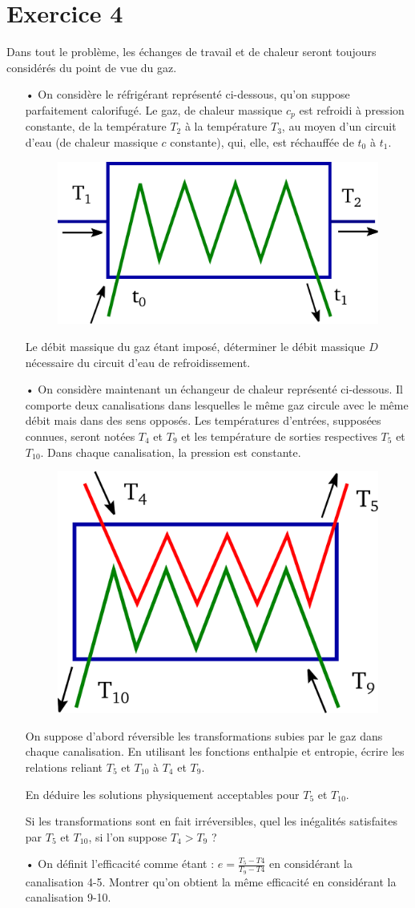 \documentclass{report}
\begin{document}
\section*{Exercice 4}

Dans tout le problème, les échanges de travail et de chaleur seront toujours considérés du point de vue du gaz.
\begin{itemize}

\item[•] On considère le réfrigérant représenté ci-dessous, qu'on suppose parfaitement calorifugé. Le gaz, de chaleur massique $c_{p}$ est refroidi à pression constante, de la température $T_{2}$ à la température $T_{3}$, au moyen d'un circuit d'eau (de chaleur massique $c$ constante), qui, elle, est réchauffée de $t_{0}$ à $t_{1}$.

\begin{figure}[!h]
\centering
\includegraphics[width=0.3\linewidth]{refrigirant.pdf}
\end{figure}

Le débit massique du gaz étant imposé, déterminer le débit massique $D$ nécessaire du circuit d'eau de refroidissement.
\item[•] On considère maintenant un échangeur de chaleur représenté ci-dessous. Il comporte deux canalisations dans lesquelles le même gaz circule avec le même débit mais dans des sens opposés. Les températures d'entrées, supposées connues, seront notées $T_{4}$ et $T_{9}$ et les température de sorties respectives $T_{5}$ et $T_{10}$. Dans chaque canalisation, la pression est constante.
\begin{figure}[!h]
\centering
\includegraphics[width=0.3\linewidth]{echangeur.pdf}
\end{figure}
On suppose d'abord réversible les transformations subies par le gaz dans chaque canalisation. En utilisant les fonctions enthalpie et entropie, écrire les relations reliant $T_{5}$ et $T_{10}$ à $T_{4}$ et $T_{9}$.

En déduire les solutions physiquement acceptables pour $T_{5}$ et $T_{10}$.

Si les transformations sont en fait irréversibles, quel les inégalités satisfaites par $T_{5}$ et $T_{10}$, si l'on suppose $T_{4}>T_{9}$ ?

\item[•] On définit l'efficacité comme étant : $e=\frac{T_{5}-T{4}}{T_{9}-T{4}}$ en considérant la canalisation 4-5. Montrer qu'on obtient la même efficacité en considérant la canalisation 9-10.
\end{itemize}
\end{document}

